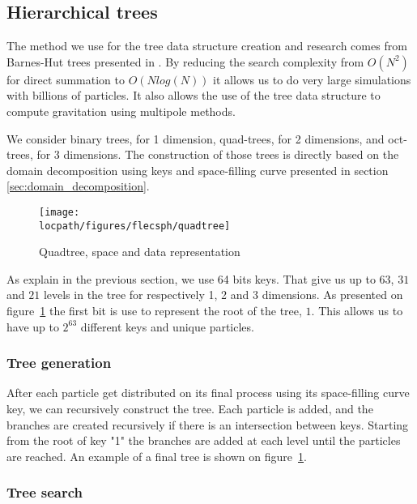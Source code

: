 \subsection{Hierarchical trees}
\label{sec:trees}

The method we use for the tree data structure creation and research comes from Barnes-Hut trees presented in \cite{barnes1986hierarchical,barnes1990modified}. 
By reducing the search complexity from $O(N^2)$ for direct summation to $O(Nlog(N))$ it allows us to do very large simulations with billions of particles. 
It also allows the use of the tree data structure to compute gravitation using multipole methods.

We consider binary trees, for 1 dimension, quad-trees, for 2 dimensions, and oct-trees, for 3 dimensions. 
The construction of those trees is directly based on the domain decomposition using keys and space-filling curve presented in section \ref{sec:domain_decomposition}. 

\begin{figure}[t!]
\centering
\texttt{[image: \\locpath/figures/flecsph/quadtree]}
\caption{Quadtree, space and data representation}
\label{fig:quadtree}
\end{figure}

As explain in the previous section, we use 64 bits keys.
That give us up to $63$, $31$ and $21$ levels in the tree for respectively 1, 2 and 3 dimensions. 
As presented on figure~\ref{fig:quadtree} the first bit is use to represent the root of the tree, $1$.
This allows us to have up to $2^{63}$ different keys and unique particles.  

\subsubsection{Tree generation}

After each particle get distributed on its final process using its space-filling curve key, we can recursively construct the tree.
Each particle is added, and the branches are created recursively if there is an intersection between keys. 
Starting from the root of key "1" the branches are added at each level until the particles are reached.
An example of a final tree is shown on figure~\ref{fig:quadtree}.

\subsubsection{Tree search}

